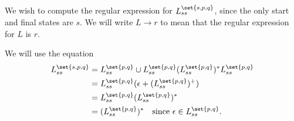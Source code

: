 \documentclass[12pt]{article}
\newcommand\hasregex{\rightarrow}
\begin{document}
\begin{solution}
    We wish to compute the regular expression for $L_{ss}^{\set{s, p, q}}$,
    since the only start and final states are $s$.
    We will write $L \hasregex r$ to mean that the regular expression
    for $L$ is $r$.

    We will use the equation \begin{align*}
        L_{ss}^{\set{s, p, q}} &= L_{ss}^{\set{p, q}} \cup
            L_{ss}^{\set{p, q}} (L_{ss}^{\set{p, q}})^* L_{ss}^{\set{p, q}} \\
        &= L_{ss}^{\set{p, q}} (\epsilon + (L_{ss}^{\set{p, q}})^+) \\
        &= L_{ss}^{\set{p, q}} (L_{ss}^{\set{p, q}})^* \\
        &= (L_{ss}^{\set{p, q}})^* \quad \text{since $\epsilon \in L_{ss}^{\set{p, q}}$.}
    \end{align*}


\end{solution}
\end{document}

